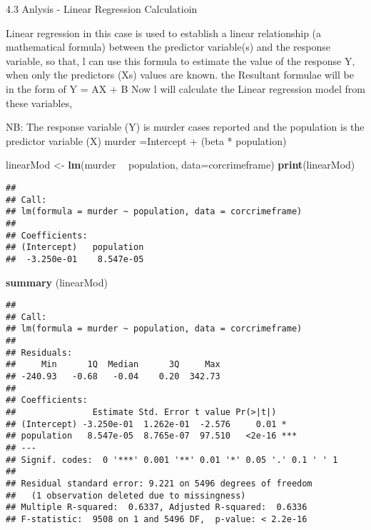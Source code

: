 \documentclass[]{article}
\newenvironment{Shaded}{\begin{snugshade}}{\end{snugshade}}
\newcommand{\KeywordTok}[1]{\textcolor[rgb]{0.13,0.29,0.53}{\textbf{#1}}}
\newcommand{\DataTypeTok}[1]{\textcolor[rgb]{0.13,0.29,0.53}{#1}}
\newcommand{\StringTok}[1]{\textcolor[rgb]{0.31,0.60,0.02}{#1}}
\newcommand{\OperatorTok}[1]{\textcolor[rgb]{0.81,0.36,0.00}{\textbf{#1}}}
\newcommand{\NormalTok}[1]{#1}
\begin{document}
4.3 Anlysis - Linear Regression Calculatioin

Linear regression in this case is used to establish a linear
relationship (a mathematical formula) between the predictor variable(s)
and the response variable, so that, l can use this formula to estimate
the value of the response Y, when only the predictors (Xs) values are
known. the Resultant formulae will be in the form of Y = AX + B Now l
will calculate the Linear regression model from these variables,

NB: The response variable (Y) is murder cases reported and the
population is the predictor variable (X) murder =Intercept + (beta *
population)

\begin{Shaded}
\begin{Highlighting}[]
\NormalTok{linearMod <-}\StringTok{ }\KeywordTok{lm}\NormalTok{(murder }\OperatorTok{~}\StringTok{ }\NormalTok{population, }\DataTypeTok{data=}\NormalTok{corcrimeframe)}
\KeywordTok{print}\NormalTok{(linearMod)}
\end{Highlighting}
\end{Shaded}

\begin{verbatim}
## 
## Call:
## lm(formula = murder ~ population, data = corcrimeframe)
## 
## Coefficients:
## (Intercept)   population  
##  -3.250e-01    8.547e-05
\end{verbatim}

\begin{Shaded}
\begin{Highlighting}[]
\KeywordTok{summary}\NormalTok{ (linearMod)}
\end{Highlighting}
\end{Shaded}

\begin{verbatim}
## 
## Call:
## lm(formula = murder ~ population, data = corcrimeframe)
## 
## Residuals:
##     Min      1Q  Median      3Q     Max 
## -240.93   -0.68   -0.04    0.20  342.73 
## 
## Coefficients:
##               Estimate Std. Error t value Pr(>|t|)    
## (Intercept) -3.250e-01  1.262e-01  -2.576     0.01 *  
## population   8.547e-05  8.765e-07  97.510   <2e-16 ***
## ---
## Signif. codes:  0 '***' 0.001 '**' 0.01 '*' 0.05 '.' 0.1 ' ' 1
## 
## Residual standard error: 9.221 on 5496 degrees of freedom
##   (1 observation deleted due to missingness)
## Multiple R-squared:  0.6337, Adjusted R-squared:  0.6336 
## F-statistic:  9508 on 1 and 5496 DF,  p-value: < 2.2e-16
\end{verbatim}
\end{document}
